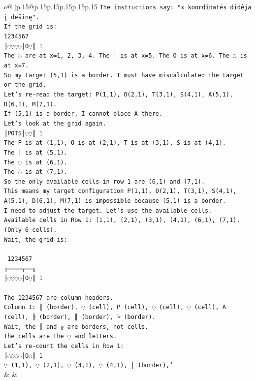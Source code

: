 \documentclass{article}
\begin{document}
{\begin{supertabular}{c@{$\;$}|p{.15\linewidth}@{}p{.15\linewidth}p{.15\linewidth}p{.15\linewidth}p{.15\linewidth}p{.15\linewidth}}
{{{\texttt{The instructions say: "x koordinatės didėja į dešinę".} \\
\texttt{If the grid is:} \\
\texttt{1234567} \\
\texttt{║◌◌◌◌│O◌║ 1} \\
\texttt{The ◌ are at x=1, 2, 3, 4. The │ is at x=5. The O is at x=6. The ◌ is at x=7.} \\
\texttt{So my target (5,1) is a border. I must have miscalculated the target or the grid.} \\
\texttt{Let's re{-}read the target: P(1,1), O(2,1), T(3,1), S(4,1), A(5,1), D(6,1), M(7,1).} \\
\texttt{If (5,1) is a border, I cannot place A there.} \\
\texttt{Let's look at the grid again.} \\
\texttt{║POTS│◌◌║ 1} \\
\texttt{The P is at (1,1), O is at (2,1), T is at (3,1), S is at (4,1).} \\
\texttt{The │ is at (5,1).} \\
\texttt{The ◌ is at (6,1).} \\
\texttt{The ◌ is at (7,1).} \\
\texttt{So the only available cells in row 1 are (6,1) and (7,1).} \\
\texttt{This means my target configuration P(1,1), O(2,1), T(3,1), S(4,1), A(5,1), D(6,1), M(7,1) is impossible because (5,1) is a border.} \\
\texttt{I need to adjust the target. Let's use the available cells.} \\
\texttt{Available cells in Row 1: (1,1), (2,1), (3,1), (4,1), (6,1), (7,1). (Only 6 cells).} \\
\texttt{Wait, the grid is:} \\
\\ 
\texttt{ 1234567} \\
\texttt{╔════╤══╗} \\
\texttt{║◌◌◌◌│O◌║ 1} \\
\\ 
\texttt{The 1234567 are column headers.} \\
\texttt{Column 1: ║ (border), ◌ (cell), P (cell), ◌ (cell), ◌ (cell), A (cell), ╟ (border), ║ (border), ╚ (border).} \\
\texttt{Wait, the ║ and ╔ are borders, not cells.} \\
\texttt{The cells are the ◌ and letters.} \\
\texttt{Let's re{-}count the cells in Row 1:} \\
\texttt{║◌◌◌◌│O◌║ 1} \\
\texttt{◌ (1,1), ◌ (2,1), ◌ (3,1), ◌ (4,1), │ (border),'} \\
            }
        }
    }
    & & \\ \\


\end{supertabular}}
\end{document}
